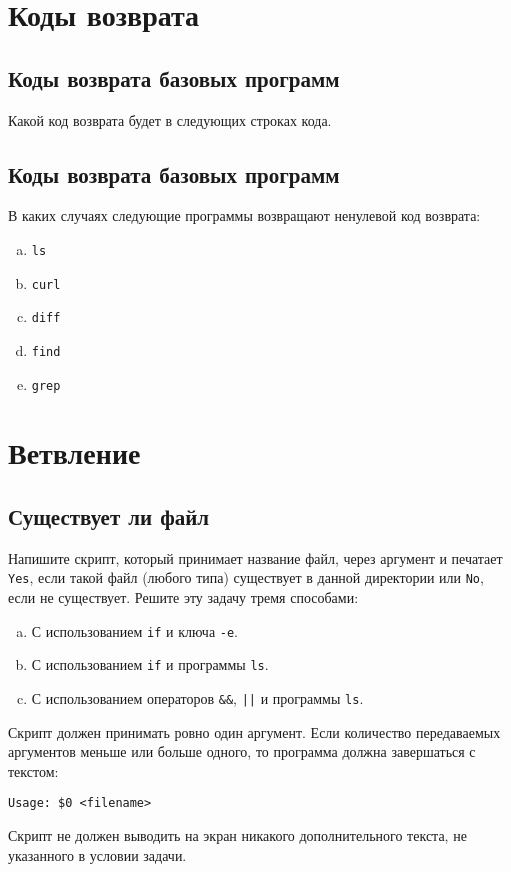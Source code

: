 \documentclass{article}
\begin{document}
\section{Коды возврата}

\subsection{Коды возврата базовых программ}
Какой код возврата будет в следующих строках кода.

\subsection{Коды возврата базовых программ}
В каких случаях следующие программы возвращают ненулевой код возврата:
\begin{enumerate}[a.]
\item \texttt{ls}
\item \texttt{curl}
\item \texttt{diff}
\item \texttt{find}
\item \texttt{grep}
\end{enumerate}



\section{Ветвление}
\subsection{Существует ли файл}
Напишите скрипт, который принимает название файл, через аргумент и печатает \texttt{Yes}, если такой файл (любого типа) существует в данной директории или \texttt{No}, если не существует. Решите эту задачу тремя способами:
\begin{enumerate}[(a)]
\item С использованием \texttt{if} и ключа \texttt{-e}.
\item С использованием \texttt{if} и программы \texttt{ls}.
\item С использованием операторов \texttt{\&\&}, \texttt{||} и программы \texttt{ls}.
\end{enumerate}
Скрипт должен принимать ровно один аргумент. Если количество передаваемых аргументов меньше или больше одного, то программа должна завершаться с текстом:
\begin{lstlisting}
Usage: $0 <filename>
\end{lstlisting}
Скрипт не должен выводить на экран никакого дополнительного текста, не указанного в условии задачи.
\end{document}
